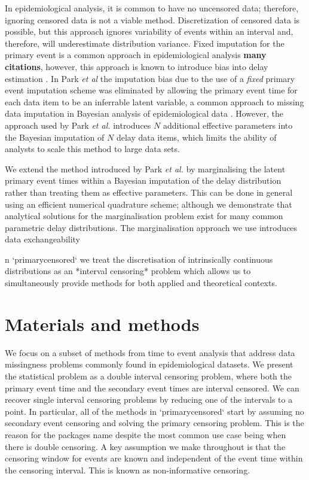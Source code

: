 \documentclass[10pt,letterpaper]{article}
\begin{document}
In epidemiological analysis, it is common to have no uncensored data; therefore, ignoring censored data is not a viable method. Discretization of censored data is possible, but this approach ignores variability of events within an interval and, therefore, will underestimate distribution variance. Fixed imputation for the primary event is a common approach in epidemiological analysis \textbf{many citations}, however, this approach is known to introduce bias into delay estimation \cite{law1992effects,Park2024.01.12.24301247}. In Park \textit{et al} \cite{Park2024.01.12.24301247} the imputation bias due to the use of a \textit{fixed} primary event imputation scheme was eliminated by allowing the primary event time for each data item to be an inferrable latent variable, a common approach to missing data imputation in Bayesian analysis of epidemiological data \cite{o1999bayesian}. However, the approach used by Park \textit{ et al.} introduces $N$ additional effective parameters into the Bayesian imputation of $N$ delay data items, which limits the ability of analysts to scale this method to large data sets.

We extend the method introduced by Park \textit{ et al.} by marginalising the latent primary event times within a Bayesian imputation of the delay distribution rather than treating them as effective parameters. This can be done in general using an efficient numerical quadrature scheme; although we demonstrate that analytical solutions for the marginalisation problem exist for many common parametric delay distributions. The marginalisation approach we use introduces data exchangeability \cite{gelman_bayesian_2013} 

n `primarycensored` we treat the discretisation of intrinsically continuous distributions as an *interval censoring* problem which allows us to simultaneously provide methods for both applied and theoretical contexts.

\section*{Materials and methods}


We focus on a subset of methods from time to event analysis that address data missingness problems commonly found in epidemiological datasets. We present the statistical problem as a double interval censoring problem, where both the primary event time and the secondary event times are interval censored. We can recover single interval censoring problems by reducing one of the intervals to a point. In particular, all of the methods in `primarycensored` start by assuming no secondary event censoring and solving the primary censoring problem. This is the reason for the packages name despite the most common use case being when there is double censoring. A key assumption we make throughout is that the censoring window for events are known and independent of the event time within the censoring interval. This is known as non-informative censoring.
\end{document}
